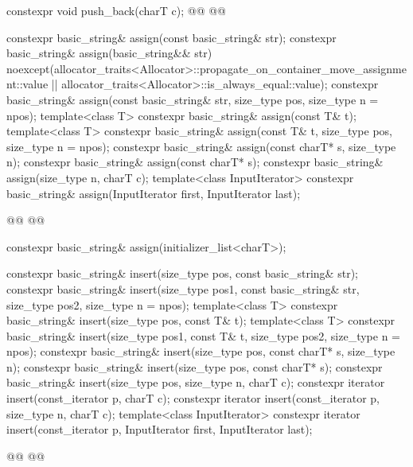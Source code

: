 \documentclass{wg21}
\begin{document}
\begin{codeblock}
{{        constexpr void push_back(charT c);
        @@
        @@

        constexpr basic_string& assign(const basic_string& str);
        constexpr basic_string& assign(basic_string&& str)
        noexcept(allocator_traits<Allocator>::propagate_on_container_move_assignment::value ||
        allocator_traits<Allocator>::is_always_equal::value);
        constexpr basic_string& assign(const basic_string& str, size_type pos, size_type n = npos);
        template<class T>
        constexpr basic_string& assign(const T& t);
        template<class T>
        constexpr basic_string& assign(const T& t, size_type pos, size_type n = npos);
        constexpr basic_string& assign(const charT* s, size_type n);
        constexpr basic_string& assign(const charT* s);
        constexpr basic_string& assign(size_type n, charT c);
        template<class InputIterator>
        constexpr basic_string& assign(InputIterator first, InputIterator last);

        @@
        @@

        constexpr basic_string& assign(initializer_list<charT>);

        constexpr basic_string& insert(size_type pos, const basic_string& str);
        constexpr basic_string& insert(size_type pos1, const basic_string& str,
        size_type pos2, size_type n = npos);
        template<class T>
        constexpr basic_string& insert(size_type pos, const T& t);
        template<class T>
        constexpr basic_string& insert(size_type pos1, const T& t,
        size_type pos2, size_type n = npos);
        constexpr basic_string& insert(size_type pos, const charT* s, size_type n);
        constexpr basic_string& insert(size_type pos, const charT* s);
        constexpr basic_string& insert(size_type pos, size_type n, charT c);
        constexpr iterator insert(const_iterator p, charT c);
        constexpr iterator insert(const_iterator p, size_type n, charT c);
        template<class InputIterator>
        constexpr iterator insert(const_iterator p, InputIterator first, InputIterator last);

        @@
        @@

}}
\end{codeblock}
\end{document}
